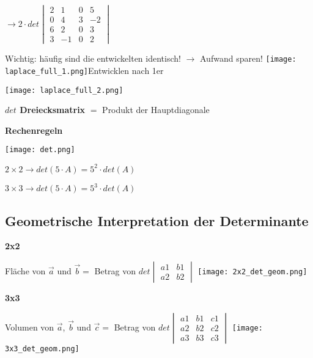 \begin{multicols*}{3}
{\begin{multicols}{2}
            {  $ \rightarrow  2 \cdot det \begin{vmatrix} 2 & 1 & 0 & 5 \\ 0 & 4 & 3 & -2 \\ 6 & 2 &0 & 3 \\ 3 & -1 &0 & 2 \end{vmatrix} $}
        \end{multicols}}
    {\small{Wichtig: häufig sind die entwickelten identisch! $\rightarrow$ Aufwand sparen!}}
    {\texttt{[image: laplace\_full\_1.png]}Entwicklen nach 1er}

    {\texttt{[image: laplace\_full\_2.png]}}


    \textbf{$det$ Dreiecksmatrix}
    $ = $ Produkt der Hauptdiagonale
    \WhiteSpace

    \textbf{Rechenregeln}

    {\texttt{[image: det.png]}}

    $2\times 2 \rightarrow det(5 \cdot A) = 5^2 \cdot det(A)$

    $3\times 3 \rightarrow det(5 \cdot A) = 5^3 \cdot det(A)$

    \WhiteSpace
    \subsection{Geometrische Interpretation der Determinante }
    {\textbf{2x2}}

    {Fläche von $\vec{a} $ und $ \vec{b} = $ Betrag von $ det \begin{vmatrix} a1 & b1  \\ a2 & b2 \end{vmatrix} $}
    {\texttt{[image: 2x2\_det\_geom.png]}}




    \textbf{3x3}

    {Volumen von $\vec{a} $, $ \vec{b}$ und $\vec{c} = $ Betrag von $   det \begin{vmatrix} a1 & b1 & c1 \\ a2 & b2 & c2 \\ a3 & b3 & c3  \end{vmatrix}  $}
    {\texttt{[image: 3x3\_det\_geom.png]}}
    \mbox{}



\end{multicols*}
